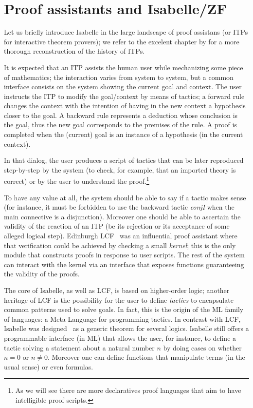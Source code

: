 \section{Proof assistants and Isabelle/ZF}
\label{sec:proof-assist-isabelle}

Let us briefly introduce Isabelle in the large landscape of proof
assistans (or ITPs for interactive theorem provers); we refer to the
excelent chapter by \citet{DBLP:series/hhl/HarrisonUW14} for a more
thorough reconstruction of the history of ITPs.

It is expected that an ITP assists the human user while mechanizing
some piece of mathematics; the interaction varies from system to
system, but a common interface consists on the system showing the
current goal and context. The user instructs the ITP to modify the
goal/context by means of tactics; a forward rule changes the context
with the intention of having in the new context a hypothesis closer to
the goal. A backward rule represents a deduction whose conclusion is
the goal, thus the new goal corresponds to the premises of the rule. A
proof is completed when the (current) goal is an instance of a
hypothesis (in the current context).

In that dialog, the user produces a script of tactics that can be
later reproduced step-by-step by the system (to check, for example,
that an imported theory is correct) or by the user to understand
the proof.\footnote{As we will see there are more declaratives
proof languages that aim to have intelligible proof scripts.}

To have any value at all, the system should be able to say if a tactic
makes sense (for instance, it must be forbidden to use the backward
tactic \textit{conjI} when the main connective is a
disjunction). Moreover one should be able to ascertain the validity of
the reaction of an ITP (be its rejection or its acceptance of some
alleged logical step). Edinburgh LCF~\cite{Gordon1979-qm} was an
influential proof assistant where that verification could be achieved
by checking a small \emph{kernel}; this is the only module that
constructs proofs in response to user scripts. The rest of the system
can interact with the kernel via an interface that exposes functions
guaranteeing the validity of the proofs.

The core of Isabelle, as well as LCF, is based on higher-order logic;
another heritage of LCF is the possibility for the user to define
\emph{tactics} to encapsulate common patterns used to solve goals. In
fact, this is the origin of the ML family of languages: a
Meta-Language for programming tactics. In contrast with LCF, Isabelle
was designed~\cite{Paulson1990} as a generic theorem for several
logics. Isabelle still offers a programmable interface (in ML) that
allows the user, for instance, to define a tactic solving a statement
about a natural number $n$ by doing cases on whether $n=0$ or
$n\neq 0$.  Moreover one can define functions that manipulate terms
(in the usual sense) or even formulas.

